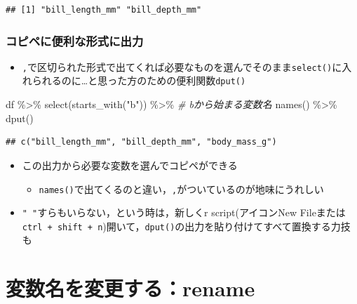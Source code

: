 \documentclass[
  xelatex,ja=standard, b5paper]{bxjsbook}
\newenvironment{Shaded}{\begin{snugshade}}{\end{snugshade}}
\newcommand{\CommentTok}[1]{\textcolor[rgb]{0.56,0.35,0.01}{\textit{#1}}}
\newcommand{\FunctionTok}[1]{\textcolor[rgb]{0.00,0.00,0.00}{#1}}
\newcommand{\NormalTok}[1]{#1}
\newcommand{\SpecialCharTok}[1]{\textcolor[rgb]{0.00,0.00,0.00}{#1}}
\newcommand{\StringTok}[1]{\textcolor[rgb]{0.31,0.60,0.02}{#1}}
\providecommand{\tightlist}{%
  \setlength{\itemsep}{0pt}\setlength{\parskip}{0pt}}
\begin{document}
\begin{verbatim}
## [1] "bill_length_mm" "bill_depth_mm"
\end{verbatim}

\hypertarget{select-get-out}{%
\subsection{コピペに便利な形式に出力}\label{select-get-out}}

\begin{itemize}
\tightlist
\item
  \texttt{,}で区切られた形式で出てくれば必要なものを選んでそのまま\texttt{select()}に入れられるのに\ldots と思った方のための便利関数\texttt{dput()}
\end{itemize}

\begin{Shaded}
\begin{Highlighting}[]
\NormalTok{df }\SpecialCharTok{\%\textgreater{}\%} 
  \FunctionTok{select}\NormalTok{(}\FunctionTok{starts\_with}\NormalTok{(}\StringTok{"b"}\NormalTok{)) }\SpecialCharTok{\%\textgreater{}\%} \CommentTok{\# bから始まる変数名}
  \FunctionTok{names}\NormalTok{() }\SpecialCharTok{\%\textgreater{}\%} 
  \FunctionTok{dput}\NormalTok{()}
\end{Highlighting}
\end{Shaded}

\begin{verbatim}
## c("bill_length_mm", "bill_depth_mm", "body_mass_g")
\end{verbatim}

\begin{itemize}
\tightlist
\item
  この出力から必要な変数を選んでコピペができる

  \begin{itemize}
  \tightlist
  \item
    \texttt{names()}で出てくるのと違い，\texttt{,}がついているのが地味にうれしい
  \end{itemize}
\item
  \texttt{"\ "}すらもいらない，という時は，新しくr script(アイコンNew Fileまたは\texttt{ctrl\ +\ shift\ +\ n})開いて，\texttt{dput()}の出力を貼り付けてすべて置換する力技も
\end{itemize}

\hypertarget{rename}{%
\chapter{変数名を変更する：rename}\label{rename}}
\end{document}
